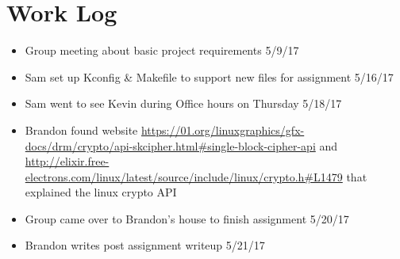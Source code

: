 \documentclass{article}
\begin{document}
\section{Work Log}
\begin{itemize}
    \item     Group meeting about basic project requirements 5/9/17
    \item Sam set up Kconfig \& Makefile to support new files for assignment 5/16/17
    \item Sam went to see Kevin during Office hours on Thursday 5/18/17
    \item Brandon found website \url{https://01.org/linuxgraphics/gfx-docs/drm/crypto/api-skcipher.html#single-block-cipher-api} and
    \url{http://elixir.free-electrons.com/linux/latest/source/include/linux/crypto.h#L1479}  that explained the linux crypto API
    \item     Group came over to Brandon’s house to finish assignment 5/20/17
    \item     Brandon writes post assignment writeup 5/21/17

\end{itemize}
\end{document}
